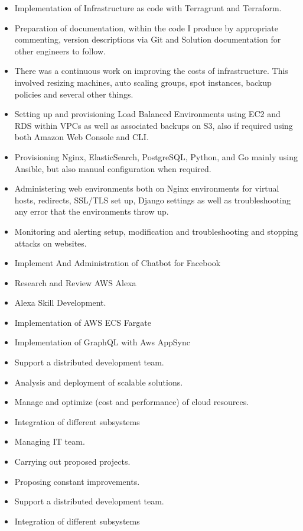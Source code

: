 \divider

\begin{itemize}
  \item Implementation of Infrastructure as code with Terragrunt and Terraform.
  \item Preparation of documentation, within the code I produce by appropriate commenting, version descriptions via Git and Solution documentation for other engineers to follow.
  \item There was a continuous work on improving the costs of infrastructure. This involved resizing machines, auto scaling groups, spot instances, backup policies and several other things.
  \item Setting up and provisioning Load Balanced Environments using EC2 and RDS within VPCs as well as associated backups on S3, also if required using both Amazon Web Console and CLI.
  \item Provisioning Nginx, ElasticSearch, PostgreSQL, Python, and Go mainly using Ansible, but also manual configuration when required.
  \item Administering web environments both on Nginx environments for virtual hosts, redirects, SSL/TLS set up, Django settings as well as troubleshooting any error that the environments throw up.
  \item Monitoring and alerting setup, modification and troubleshooting and stopping attacks on websites.
  \item Implement And Administration of Chatbot for Facebook
  \item Research and Review AWS Alexa
  \item Alexa Skill Development.
  \item Implementation of AWS ECS Fargate
  \item Implementation of GraphQL with Aws AppSync
\end{itemize}

\divider

\begin{itemize}
  \item Support a distributed development team.
  \item Analysis and deployment of scalable solutions.
  \item Manage and optimize (cost and performance) of cloud resources.
  \item Integration of different subsystems
  \item Managing IT team.
  \item Carrying out proposed projects.
  \item Proposing constant improvements.
  \item Support a distributed development team.
  \item Integration of different subsystems
\end{itemize}

